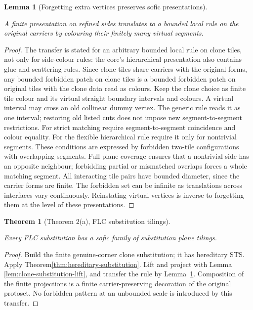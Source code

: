 \documentclass[11pt,a4paper]{article}
\newtheorem{lemma}[definition]{Lemma}
\newtheorem{theorem}[definition]{Theorem}
\theoremstyle{remark}
\newcommand{\lean}[1]{}
\newcommand{\uses}[1]{}
\begin{document}
\begin{lemma}[Forgetting extra vertices preserves sofic presentations]
\label{lem:segment-rules}
\lean{Tilings.FLC.forget_vertices_preserves_sofic}
\uses{def:localrule,def:sofic,def:clones}
A finite presentation on refined sides translates to a bounded local rule
on the original carriers by colouring their finitely many virtual segments.
\end{lemma}
\begin{proof}
The transfer is stated for an arbitrary bounded local rule on clone tiles,
not only for side-colour rules: the core's hierarchical presentation also
contains glue and scattering rules. Since clone tiles share carriers with
the original forms, any bounded forbidden patch on clone tiles is a
bounded forbidden patch on original tiles with the clone data read as
colours. Keep the clone choice as finite tile colour and its virtual straight
boundary intervals and colours. A virtual interval may cross an old
collinear dummy vertex. The generic rule reads it as one interval; restoring
old listed cuts does not impose new segment-to-segment restrictions.
For strict matching require segment-to-segment coincidence and colour
equality. For the flexible hierarchical rule require it only for
nontrivial segments. These conditions are expressed by forbidden
two-tile configurations with overlapping segments. Full plane coverage
ensures that a nontrivial side has an opposite neighbour; forbidding
partial or mismatched overlaps forces a whole matching segment.
All interacting tile pairs have bounded diameter, since the carrier forms
are finite. The forbidden set can be infinite as translations across
interfaces vary continuously. Reinstating virtual vertices is inverse to
forgetting them at the level of these presentations.
\end{proof}

\begin{theorem}[Theorem 2(a), FLC substitution tilings]\label{thm:flc-substitution}
\lean{Tilings.Main.flc_substitution_sofic}
\uses{def:flc,def:sofic}
Every FLC substitution has a sofic family of substitution plane tilings.
\end{theorem}
\begin{proof}
\uses{lem:finite-neighbourhoods,lem:clone-sts,lem:clone-substitution-lift,thm:hereditary-substitution,lem:segment-rules}
Build the finite genuine-corner clone substitution; it has hereditary STS.
Apply Theorem\ref{thm:hereditary-substitution}. Lift and project with Lemma
\ref{lem:clone-substitution-lift}, and transfer the rule by
Lemma~\ref{lem:segment-rules}. Composition of the finite projections is
a finite carrier-preserving decoration of the original protoset.
No forbidden pattern at an unbounded scale is introduced by this transfer.
\end{proof}
\end{document}

